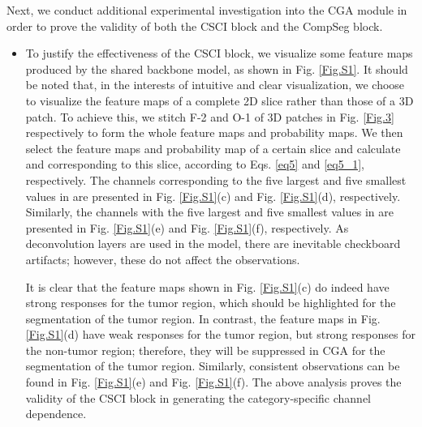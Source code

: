 \documentclass[journal,twoside]{IEEEtran}
\begin{document}
Next, we conduct additional experimental investigation into the CGA module in order to prove the validity of both the CSCI block and the CompSeg block.
\begin{itemize}
\item To justify the effectiveness of the CSCI block,
we visualize some feature maps produced by the shared backbone model, as shown in Fig. \ref{Fig.S1}. It should be noted that, in the interests of intuitive and clear visualization, we choose to visualize the feature maps of a complete 2D slice rather than those of a 3D patch. To achieve this, we stitch F-2 and O-1 of 3D patches in Fig. \ref{Fig.3} respectively to form the whole feature maps and probability maps. We then select the feature maps  and probability map  of a certain slice and calculate   and  corresponding to this slice, according to Eqs. \ref{eq5} and \ref{eq5_1}, respectively. The channels corresponding to the five largest and five smallest values in  are presented in Fig. \ref{Fig.S1}(c) and Fig. \ref{Fig.S1}(d), respectively. Similarly, the channels with the five largest and five smallest values in  are presented in Fig. \ref{Fig.S1}(e) and Fig. \ref{Fig.S1}(f), respectively. As deconvolution layers are used in the model, there are inevitable checkboard artifacts; however, these do not affect the observations.  


It is clear that the feature maps shown in Fig. \ref{Fig.S1}(c) do indeed have strong responses for the tumor region, which should be highlighted for the segmentation of the tumor region. In contrast, the feature maps in Fig. \ref{Fig.S1}(d) have weak responses for the tumor region, but strong responses for the non-tumor region; therefore, they will be suppressed in CGA for the segmentation of the tumor region.  Similarly, consistent observations can be found in Fig. \ref{Fig.S1}(e) and Fig. \ref{Fig.S1}(f). The above analysis proves the validity of the CSCI block in generating the category-specific channel dependence.
	 	





\end{itemize}
\end{document}
